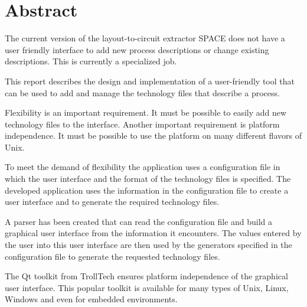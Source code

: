 
\chapter*{Abstract}
The current version of the layout-to-circuit extractor SPACE does not have a
user friendly interface to add new process descriptions or change existing
descriptions. This is currently a specialized job.

\bigskip \noindent
This report describes the design and implementation of a user-friendly tool
that can be used to add and manage the technology files that describe a
process.

\bigskip \noindent
Flexibility is an important requirement. It must be possible to easily add new
technology files to the interface. Another important requirement is platform
independence. It must be possible to use the platform on many different flavors
of Unix.

\bigskip \noindent
To meet the demand of flexibility the application uses a configuration file in
which the user interface and the format of the technology files is specified.
The developed application uses the information in the configuration file to
create a user interface and to generate the required technology files.

A parser has been created that can read the configuration file and build a
graphical user interface from the information it encounters. The values entered
by the user into this user interface are then used by the generators specified
in the configuration file to generate the requested technology files.

\bigskip \noindent
The Qt toolkit from TrollTech ensures platform independence of the graphical
user interface. This popular toolkit is available for many types of Unix,
Linux, Windows and even for embedded environments.
